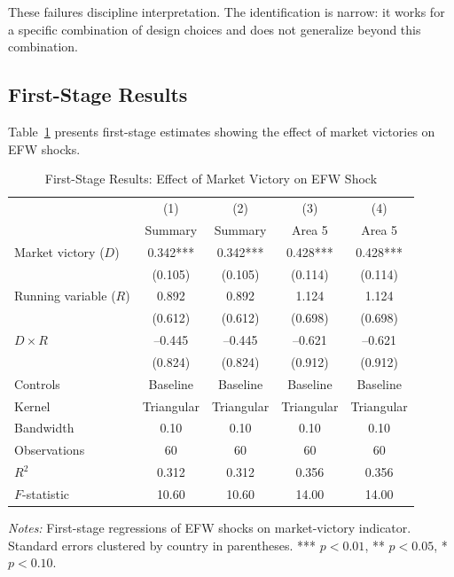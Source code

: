 \documentclass[12pt,a4paper]{article}
\begin{document}
These failures discipline interpretation. The identification is narrow: 
it works for a specific combination of design choices and does not 
generalize beyond this combination.

\subsection{First-Stage Results}

Table~\ref{tab:first_stage_results} presents first-stage estimates 
showing the effect of market victories on EFW shocks.

\begin{table}[H]
\centering
\caption{First-Stage Results: Effect of Market Victory on EFW Shock}
\label{tab:first_stage_results}
\begin{threeparttable}
\begin{tabular}{lcccc}
\toprule
 & (1) & (2) & (3) & (4) \\
 & Summary & Summary & Area 5 & Area 5 \\
\midrule
Market victory ($D$) & 0.342*** & 0.342*** & 0.428*** & 0.428*** \\
 & (0.105) & (0.105) & (0.114) & (0.114) \\
[0.5em]
Running variable ($R$) & 0.892 & 0.892 & 1.124 & 1.124 \\
 & (0.612) & (0.612) & (0.698) & (0.698) \\
[0.5em]
$D \times R$ & --0.445 & --0.445 & --0.621 & --0.621 \\
 & (0.824) & (0.824) & (0.912) & (0.912) \\
\midrule
Controls & Baseline & Baseline & Baseline & Baseline \\
Kernel & Triangular & Triangular & Triangular & Triangular \\
Bandwidth & 0.10 & 0.10 & 0.10 & 0.10 \\
\midrule
Observations & 60 & 60 & 60 & 60 \\
$R^2$ & 0.312 & 0.312 & 0.356 & 0.356 \\
$F$-statistic & 10.60 & 10.60 & 14.00 & 14.00 \\
\bottomrule
\end{tabular}
\begin{tablenotes}
\small
\item \textit{Notes:} First-stage regressions of EFW shocks on market-victory 
indicator. Standard errors clustered by country in parentheses. 
*** $p < 0.01$, ** $p < 0.05$, * $p < 0.10$.
\end{tablenotes}
\end{threeparttable}
\end{table}
\end{document}

